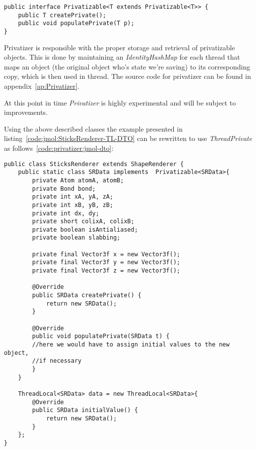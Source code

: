 \begin{lstlisting}[caption={Privatizable source
code}, label = {code:privatizable}]
public interface Privatizable<T extends Privatizable<T>> {
	public T createPrivate();
	public void populatePrivate(T p);
}
\end{lstlisting}


Privatizer is responsible with the proper storage and retrieval of privatizable
objects. This is done by maintaining an \emph{IdentityHashMap} for each thread
that maps an object (the original object who's state we're saving) to its
corresponding copy, which is then used in thread. The source code for privatizer
can be found in appendix~\ref{ap:Privatizer}.

At this point in time \emph{Privatizer} is highly experimental and will be
subject to improvements.

Using the above described classes the example presented in
listing~\ref{code:jmol:SticksRenderer-TL-DTO} can be rewritten to use
\emph{ThreadPrivate} as follows~\ref{code:privatizer:jmol-dto}:

\begin{lstlisting}[caption={Using a data transfer object}, label =
{code:privatizer:jmol-dto}]
public class SticksRenderer extends ShapeRenderer {
	public static class SRData implements  Privatizable<SRData>{
		private Atom atomA, atomB;
  		private Bond bond;
  		private int xA, yA, zA;
  		private int xB, yB, zB;
  		private int dx, dy;
  		private short colixA, colixB;
		private boolean isAntialiased;
  		private boolean slabbing;
  
  		private final Vector3f x = new Vector3f();
  		private final Vector3f y = new Vector3f();
  		private final Vector3f z = new Vector3f();
  		
		@Override
		public SRData createPrivate() {
			return new SRData();
		}

		@Override
		public void populatePrivate(SRData t) {
		//here we would have to assign initial values to the new object, 
		//if necessary
		}
	}
	
	ThreadLocal<SRData> data = new ThreadLocal<SRData>{
		@Override
		public SRData initialValue() {
			return new SRData();
		}
	};
}
\end{lstlisting}



